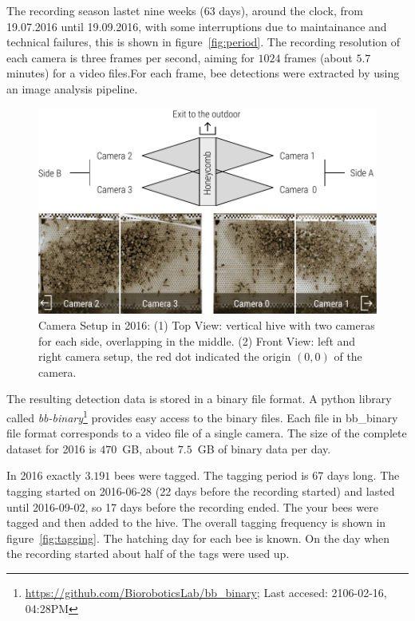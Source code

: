 The recording season lastet nine weeks (63 days), around the clock, from 19.07.2016 until 19.09.2016, with some interruptions due to maintainance and technical failures, this is shown in figure~\ref{fig:period}.
The recording resolution of each camera is three frames per second, aiming for $1024$ frames (about $5.7$ minutes) for a video files.For each frame, bee detections were extracted by using an image analysis pipeline.

\begin{figure}[htb]
	\centering
	\includegraphics[width=1.0\textwidth]{Figures/setupCams}
	\caption{Camera Setup in 2016: (1) Top View:  vertical hive with two cameras for each side, overlapping in the middle. (2) Front View: left and right camera setup, the red dot indicated the origin $(0,0)$ of the camera.}
	\label{fig:cams}
\end{figure}

The resulting detection data is stored in a binary file format. A python library called \emph{bb-binary}\footnote{\url{https://github.com/BioroboticsLab/bb_binary}; Last accesed: 2106-02-16, 04:28PM} provides easy access to the binary files. Each file in bb\_binary file format corresponds to a video file of a single camera.
The size of the complete dataset for 2016 is $470$~GB, about $7.5$~GB of binary data per day.

In 2016 exactly $3.191$ bees were tagged. The tagging period is 67 days long. The tagging started on 2016-06-28 (22 days before the recording started) and lasted until 2016-09-02, so 17 days before the recording ended. The your bees were tagged and then added to the hive. The overall tagging frequency is shown in figure~\ref{fig:tagging}. The hatching day for each bee is known. On the day when the recording started about half of the tags were used up. 

